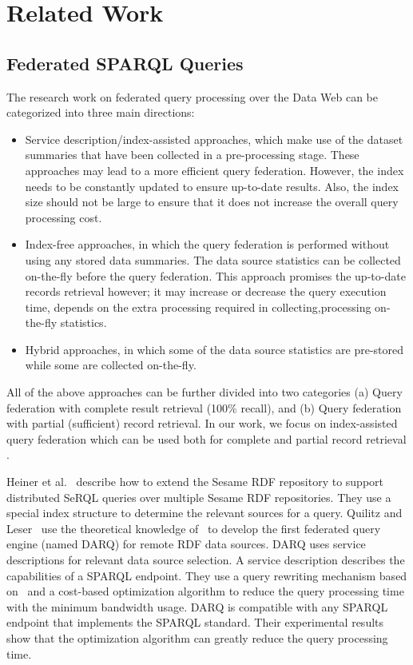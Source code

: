 \documentclass{sig-alternate}  %
\begin{document}
\section{Related Work}
\subsection{Federated SPARQL Queries}
The research work on federated query processing over the Data Web
can be categorized into three main directions: 
\begin{itemize}
\item Service description/index-assisted approaches, which make use of the dataset summaries that have been collected in a pre-processing stage. These approaches may lead to a more efficient query federation. However,
the index needs to be constantly updated to ensure up-to-date results.
Also, the index size should not be large to ensure that it does not
increase the overall query processing cost. 
\item Index-free approaches, in which the query federation is performed
without using any stored data summaries. The data source statistics can be collected on-the-fly before the query federation. This approach promises the up-to-date records retrieval however; it may increase or decrease the query execution time, depends on the extra processing required in collecting,processing on-the-fly statistics.
\item Hybrid approaches, in which some of the data source statistics are pre-stored while some are collected on-the-fly. 
\end{itemize}

All of the above approaches can be further divided into two categories
(a) Query federation with complete result retrieval (100\% recall), and (b) Query federation
with partial (sufficient) record retrieval. In our work, we focus
on index-assisted query federation which can be used both for complete and partial record retrieval .

Heiner et al.~\cite{key-1} describe how to extend the Sesame RDF
repository to support distributed SeRQL queries over multiple Sesame
RDF repositories. They use a special index structure to determine
the relevant sources for a query. Quilitz and Leser~\cite{key-2}
use the theoretical knowledge of~\cite{key-1} to develop the first federated
query engine (named DARQ) for remote RDF data sources. DARQ uses service
descriptions for relevant data source selection. A service description
describes the capabilities of a SPARQL endpoint. They use a query rewriting
mechanism based on~\cite{key-8} and a cost-based optimization algorithm
to reduce the query processing time with the minimum bandwidth usage.
DARQ is compatible with any SPARQL endpoint that implements the SPARQL
standard. Their experimental results show that the optimization algorithm
can greatly reduce the query processing time.
\end{document}
